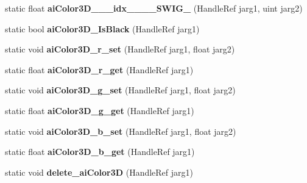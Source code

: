 \begin{DoxyCompactItemize}
\item 
\hypertarget{class_assimp_p_i_n_v_o_k_e_a308c4e133bae4c31145dc32a857e7d14}{static float {\bfseries ai\+Color3\+D\+\_\+\+\_\+\+\_\+idx\+\_\+\+\_\+\+\_\+\+\_\+\+S\+W\+I\+G\+\_} (Handle\+Ref jarg1, uint jarg2)}\label{class_assimp_p_i_n_v_o_k_e_a308c4e133bae4c31145dc32a857e7d14}

\item 
\hypertarget{class_assimp_p_i_n_v_o_k_e_a40958663c460aa51581337fba714815d}{static bool {\bfseries ai\+Color3\+D\+\_\+\+Is\+Black} (Handle\+Ref jarg1)}\label{class_assimp_p_i_n_v_o_k_e_a40958663c460aa51581337fba714815d}

\item 
\hypertarget{class_assimp_p_i_n_v_o_k_e_a7fe75cae0915090a1d74af0219bce72e}{static void {\bfseries ai\+Color3\+D\+\_\+r\+\_\+set} (Handle\+Ref jarg1, float jarg2)}\label{class_assimp_p_i_n_v_o_k_e_a7fe75cae0915090a1d74af0219bce72e}

\item 
\hypertarget{class_assimp_p_i_n_v_o_k_e_a5588586e98d5010600365d3631fe1478}{static float {\bfseries ai\+Color3\+D\+\_\+r\+\_\+get} (Handle\+Ref jarg1)}\label{class_assimp_p_i_n_v_o_k_e_a5588586e98d5010600365d3631fe1478}

\item 
\hypertarget{class_assimp_p_i_n_v_o_k_e_aaf224834cdb497bbff36ed1370f7e1e6}{static void {\bfseries ai\+Color3\+D\+\_\+g\+\_\+set} (Handle\+Ref jarg1, float jarg2)}\label{class_assimp_p_i_n_v_o_k_e_aaf224834cdb497bbff36ed1370f7e1e6}

\item 
\hypertarget{class_assimp_p_i_n_v_o_k_e_a6fe95753c2950f16cafc9cffc832bbf1}{static float {\bfseries ai\+Color3\+D\+\_\+g\+\_\+get} (Handle\+Ref jarg1)}\label{class_assimp_p_i_n_v_o_k_e_a6fe95753c2950f16cafc9cffc832bbf1}

\item 
\hypertarget{class_assimp_p_i_n_v_o_k_e_a887f5e2e51ed2fc8fedf376de4de48c0}{static void {\bfseries ai\+Color3\+D\+\_\+b\+\_\+set} (Handle\+Ref jarg1, float jarg2)}\label{class_assimp_p_i_n_v_o_k_e_a887f5e2e51ed2fc8fedf376de4de48c0}

\item 
\hypertarget{class_assimp_p_i_n_v_o_k_e_adbe735c7e83bf1ff5cb763f85cb2b1d0}{static float {\bfseries ai\+Color3\+D\+\_\+b\+\_\+get} (Handle\+Ref jarg1)}\label{class_assimp_p_i_n_v_o_k_e_adbe735c7e83bf1ff5cb763f85cb2b1d0}

\item 
\hypertarget{class_assimp_p_i_n_v_o_k_e_a9adfb60fdf0fdfe03836b3aeec86a216}{static void {\bfseries delete\+\_\+ai\+Color3\+D} (Handle\+Ref jarg1)}\label{class_assimp_p_i_n_v_o_k_e_a9adfb60fdf0fdfe03836b3aeec86a216}


\end{DoxyCompactItemize}
